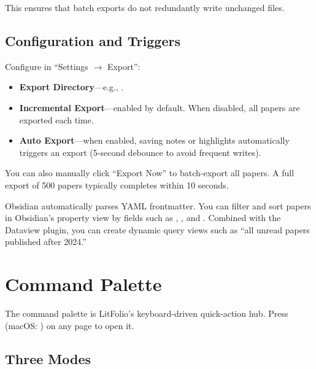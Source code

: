 This ensures that batch exports do not redundantly write unchanged files.

\section{Configuration and Triggers}

Configure in ``Settings $\rightarrow$ Export'':

\begin{itemize}
  \item \textbf{Export Directory}---e.g., .
  \item \textbf{Incremental Export}---enabled by default. When disabled, all papers are
    exported each time.
  \item \textbf{Auto Export}---when enabled, saving notes or highlights automatically
    triggers an export (5-second debounce to avoid frequent writes).
\end{itemize}

You can also manually click ``Export Now'' to batch-export all papers. A full export of
500 papers typically completes within 10 seconds.

\begin{tipbox}
Obsidian automatically parses YAML frontmatter. You can filter and sort papers in
Obsidian's property view by fields such as , , and .
Combined with the Dataview plugin, you can create dynamic query views such as
``all unread papers published after 2024.''
\end{tipbox}

\chapter{Command Palette}
\label{ch:palette}

The command palette is LitFolio's keyboard-driven quick-action hub. Press 
(macOS: ) on any page to open it.


\section{Three Modes}


